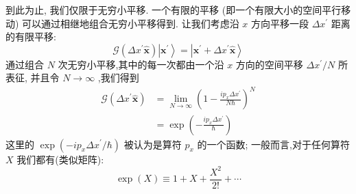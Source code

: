 	到此为止, 我们仅限于无穷小平移. 一个有限的平移 (即一个有限大小的空间平行移动) 可以通过相继地组合无穷小平移得到. 让我们考虑沿 $x$ 方向平移一段 $\Delta {x}^{\prime }$ 距离的有限平移:
	\begin{equation}
		\mathscr{G} \left( {\Delta {x}^{\prime }\widehat{\mathbf{x}}}\right) \left| {\mathbf{x}}^{\prime }\right\rangle = \left| {{\mathbf{x}}^{\prime } + \Delta {x}^{\prime }\widehat{\mathbf{x}}}\right\rangle
	\end{equation}
	通过组合 $N$ 次无穷小平移,其中的每一次都由一个沿 $x$ 方向的空间平移 $\Delta {x}^{\prime }/N$ 所表征, 并且令 $N \rightarrow \infty$ ,我们得到
	\begin{equation}
		\begin{aligned}
			\mathscr{G}\left( {\Delta {x}^{\prime }\widehat{\mathbf{x}}}\right) &= \mathop{\lim }\limits_{{N \rightarrow \infty }}{\left( 1 - \frac{i{p}_{x}\Delta {x}^{\prime }}{N\hbar }\right) }^{N}\\
			&= \exp \left( {-\frac{i{p}_{x}\Delta {x}^{\prime }}{\hbar }}\right)
		\end{aligned}
	\end{equation}
	这里的 $\exp \left( {-i{p}_{x}\Delta {x}^{\prime }/\hbar }\right)$ 被认为是算符 ${p}_{x}$ 的一个函数; 一般而言,对于任何算符 $X$ 我们都有(类似矩阵):
	\begin{equation}
		\exp \left( X\right) \equiv 1 + X + \frac{{X}^{2}}{2!} + \cdots
	\end{equation}
	
